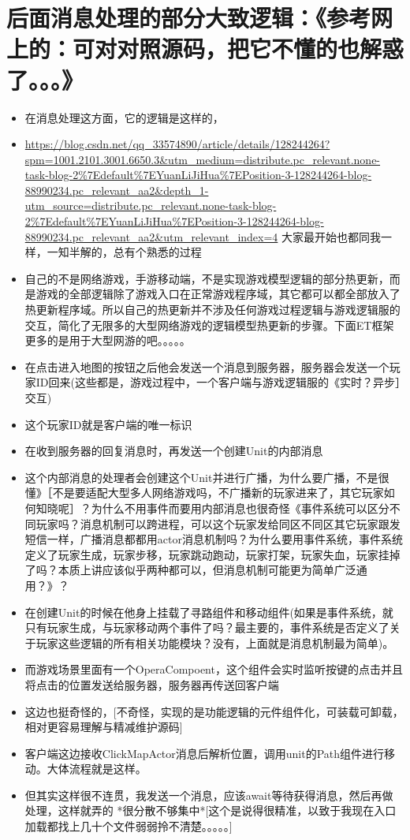 \documentclass[9pt, b5paper]{article}
\begin{document}
\section{后面消息处理的部分大致逻辑：《参考网上的：可对对照源码，把它不懂的也解惑了。。。》}
\label{sec-19}
\begin{itemize}
\item 在消息处理这方面，它的逻辑是这样的，
\item \url{https://blog.csdn.net/qq_33574890/article/details/128244264?spm=1001.2101.3001.6650.3&utm_medium=distribute.pc_relevant.none-task-blog-2\%7Edefault\%7EYuanLiJiHua\%7EPosition-3-128244264-blog-88990234.pc_relevant_aa2&depth_1-utm_source=distribute.pc_relevant.none-task-blog-2\%7Edefault\%7EYuanLiJiHua\%7EPosition-3-128244264-blog-88990234.pc_relevant_aa2&utm_relevant_index=4} 大家最开始也都同我一样，一知半解的，总有个熟悉的过程
\item\relax [与自己项目的本区别：] 自己的不是网络游戏，手游移动端，不是实现游戏模型逻辑的部分热更新，而是游戏的全部逻辑除了游戏入口在正常游戏程序域，其它都可以都全部放入了热更新程序域。所以自己的热更新并不涉及任何游戏过程逻辑与游戏逻辑服的交互，简化了无限多的大型网络游戏的逻辑模型热更新的步骤。下面ET框架更多的是用于大型网游的吧。。。。。
\item 在点击进入地图的按钮之后他会发送一个消息到服务器，服务器会发送一个玩家ID回来(这些都是，游戏过程中，一个客户端与游戏逻辑服的《实时？异步］交互)
\item 这个玩家ID就是客户端的唯一标识
\item 在收到服务器的回复消息时，再发送一个创建Unit的内部消息
\item 这个内部消息的处理者会创建这个Unit并进行广播，为什么要广播，不是很懂》［不是要适配大型多人网络游戏吗，不广播新的玩家进来了，其它玩家如何知晓呢］？为什么不用事件而要用内部消息也很奇怪《事件系统可以区分不同玩家吗？消息机制可以跨进程，可以这个玩家发给同区不同区其它玩家跟发短信一样，广播消息都都用actor消息机制吗？为什么要用事件系统，事件系统定义了玩家生成，玩家步移，玩家跳动跑动，玩家打架，玩家失血，玩家挂掉了吗？本质上讲应该似乎两种都可以，但消息机制可能更为简单广泛通用？》？
\item 在创建Unit的时候在他身上挂载了寻路组件和移动组件(如果是事件系统，就只有玩家生成，与玩家移动两个事件了吗？最主要的，事件系统是否定义了关于玩家这些逻辑的所有相关功能模块？没有，上面就是消息机制最为简单)。
\item 而游戏场景里面有一个OperaCompoent，这个组件会实时监听按键的点击并且将点击的位置发送给服务器，服务器再传送回客户端
\item 这边也挺奇怪的，[不奇怪，实现的是功能逻辑的元件组件化，可装载可卸载，相对更容易理解与精减维护源码]
\item 客户端这边接收ClickMapActor消息后解析位置，调用unit的Path组件进行移动。大体流程就是这样。
\item 但其实这样很不连贯，我发送一个消息，应该await等待获得消息，然后再做处理，这样就弄的 *很分散不够集中*[这个是说得很精准，以致于我现在入口加载都找上几十个文件弱弱拎不清楚。。。。。]
\end{itemize}
\end{document}
